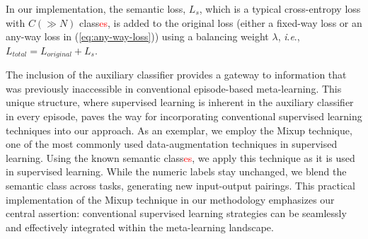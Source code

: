 \documentclass[letterpaper]{article} %
\newcommand{\nj}[1]{\textcolor{red}{#1}}
\newcommand{\jh}[1]{\textcolor{blue}{#1}}
\newcommand{\yr}[1]{\textcolor{magenta}{#1}}
\newcommand{\ie}{\textit{i}.\textit{e}., }
\begin{document}
In our implementation, the semantic loss, $L_s$, which is a typical cross-entropy loss with $C (\gg N)$ class\nj{es}, is added to the original loss (either a fixed-way loss or an any-way loss in (\ref{eq:any-way-loss})) using a balancing weight $\lambda$, \ie $L_{total} = L_{original} + L_s$.

The inclusion of the auxiliary classifier provides a gateway to information that was previously inaccessible %
in conventional episode-based meta-learning. This unique structure, where supervised learning is inherent in the auxiliary classifier in every episode, paves the way for incorporating conventional supervised learning techniques into our approach.
As an exemplar, we employ the Mixup technique, one of the most commonly used data-augmentation techniques in supervised learning. Using the known semantic class\nj{es}, we apply this technique as it is used in supervised learning. %
While the numeric labels stay unchanged, we blend the semantic class across tasks, generating new input-output pairings.
This practical implementation of the Mixup technique in our methodology emphasizes our central assertion: conventional supervised learning strategies can be seamlessly and effectively integrated within the meta-learning landscape.

\end{document}
